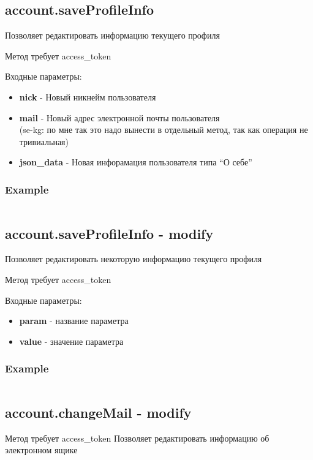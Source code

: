\subsection{account.saveProfileInfo}
Позволяет редактировать информацию текущего профиля

Метод требует access\_token

Входные параметры:
\begin{itemize}
  \item \textbf{nick} - Новый никнейм пользователя
  \item \textbf{mail} - Новый адрес электронной почты пользователя\\
  (se-kg: по мне так это надо вынести в отдельный метод, так как операция не тривиальная)
  \item \textbf{json\_data} - Новая инфорамация пользователя типа “О себе”
\end{itemize}

\subsubsection{Example}
\begin{Verbatim}[frame=single]

\end{Verbatim}

\subsection{account.saveProfileInfo - modify}
Позволяет редактировать некоторую информацию текущего профиля

Метод требует access\_token

Входные параметры:
\begin{itemize}
  \item \textbf{param} - название параметра
  \item \textbf{value} - значение параметра
\end{itemize}

\subsubsection{Example}
\begin{Verbatim}[frame=single]

\end{Verbatim}


\subsection{account.changeMail - modify}
Метод требует access\_token
Позволяет редактировать информацию об электронном ящике

